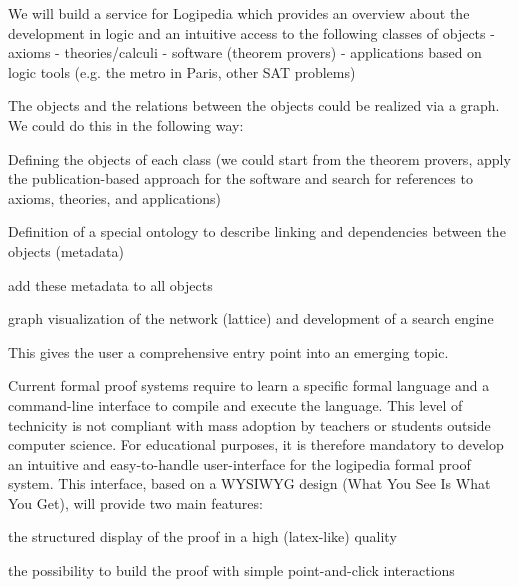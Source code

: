 \begin{workpackage}[id=dissemination,wphases=0-48,type=MGT,
  short=Dissemination,%
  title={Dissemination, communication and exploitation},
  lead=Inr]
\begin{tasklist}
  \begin{task}[id=zib,
      title=Expanding the use of Logipedia in publishing,
      lead=Zib,ZibRM=12]
    We will build a service for Logipedia which provides an overview
    about the development in logic and an intuitive access to the
    following classes of objects - axioms - theories/calculi -
    software (theorem provers) - applications based on logic tools
    (e.g. the metro in Paris, other SAT problems)

    The objects and the relations between the objects could be
    realized via a graph.  We could do this in the following way:
    \begin{compactitem}
    \item Defining the objects of each class (we could start from the
      theorem provers, apply the publication-based approach for the
      software and search for references to axioms, theories, and
      applications)
    \item Definition of a special ontology to describe linking and
      dependencies between the objects (metadata)
    \item add these metadata to all objects
    \item graph visualization of the network (lattice) and development
      of a search engine
    \end{compactitem}
    This gives the user a comprehensive entry point into an emerging
    topic.
  \end{task}

  \begin{task}[id=edukera,
      title=Web interface for doing proofs at school,
      lead=Edu,EduRM=12]
      Current formal proof systems require to learn a specific formal
      language and a command-line interface to compile and execute the
      language.  This level of technicity is not compliant with mass
      adoption by teachers or students outside computer science. For
      educational purposes, it is therefore mandatory to develop an
      intuitive and easy-to-handle user-interface for the logipedia
      formal proof system. This interface, based on a WYSIWYG design
      (What You See Is What You Get), will provide two main features:
      \begin{compactitem}
      \item the structured display of the proof in a high (latex-like) quality
      \item the possibility to build the proof with simple
        point-and-click interactions
      \end{compactitem}


\end{task}
\end{tasklist}
\end{workpackage}
